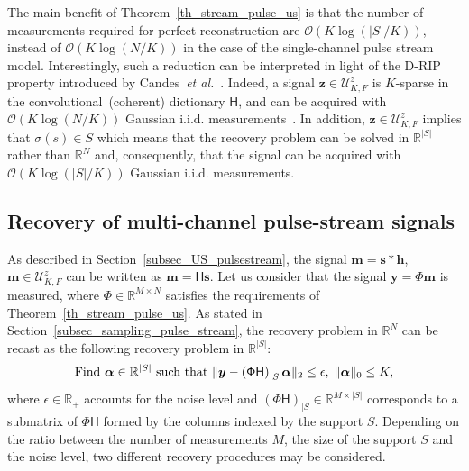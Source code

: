 \documentclass{article}
\newcommand{\etal}{\textit{et al.}}
\newcommand{\vect}[1]{\bm{#1}}
\newcommand{\mat}[1]{\mathsf{#1}}
\theoremstyle{definition}
\begin{document}
The main benefit of Theorem~\ref{th_stream_pulse_us} is that the number of measurements required for perfect reconstruction are $\mathcal{O}\left(K \log \left(|S|/K\right)\right)$, instead of $\mathcal{O}\left(K \log \left(N/K\right)\right)$ in the case of the single-channel pulse stream model.
Interestingly, such a reduction can be interpreted in light of the D-RIP property introduced by Candes~\etal{}~\cite{candes11}. 
Indeed, a signal $\vect{z} \in \mathcal{U}^z_{K,F}$ is $K$-sparse in the convolutional~(coherent) dictionary $\mat{H}$, and can be acquired with $\mathcal{O} \left(K \log \left(N / K\right)\right)$ Gaussian i.i.d. measurements~\cite{candes11}. 
In addition, $\vect{z} \in \mathcal{U}^z_{K,F}$ implies that $\sigma \left(s\right) \in S$ which means that the recovery problem can be solved in $\mathbb{R}^{|S|}$ rather than $\mathbb{R}^N$ and, consequently, that the signal can be acquired with $\mathcal{O} \left(K \log \left(|S| / K\right)\right)$ Gaussian i.i.d. measurements. 

\subsection{Recovery of multi-channel pulse-stream signals}
\label{subsec_recovery_pulse_stream}
As described in Section~\ref{subsec_US_pulsestream}, the signal $\vect{m} = \vect{s} \ast \vect{h}$, $\vect{m} \in \mathcal{U}^z_{K,F}$ can be written as $\vect{m} = \mat{H} \vect{s}$. 
Let us consider that the signal $\vect{y} = \mat{\Phi} \vect{m}$ is measured, where $\mat{\Phi} \in \mathbb{R}^{M \times N}$ satisfies the requirements of Theorem~\ref{th_stream_pulse_us}. 
As stated in Section~\ref{subsec_sampling_pulse_stream}, the recovery problem in $\mathbb{R}^N$ can be recast as the following recovery problem in $\mathbb{R}^{|S|}$:
\begin{equation}
\label{eq_problem_support}
\textnormal{Find } \vect{\alpha} \in \mathbb{R}^{|S|} \textnormal{ such that } \| \vect{y} - \left(\mat{\Phi H}\right)_{|S}\vect{\alpha}\|_2 \leq \epsilon, \; \| \vect{\alpha} \|_0 \leq K, 
\end{equation}
where $\epsilon \in \mathbb{R}_{+}$ accounts for the noise level and $\left(\mat{\Phi H}\right)_{|S} \in \mathbb{R}^{M \times |S|}$ corresponds to a submatrix of $\mat{\Phi H}$ formed by the columns indexed by the support $S$. 
Depending on the ratio between the number of measurements $M$, the size of the support $S$ and the noise level, two different recovery procedures may be considered.
\end{document}
